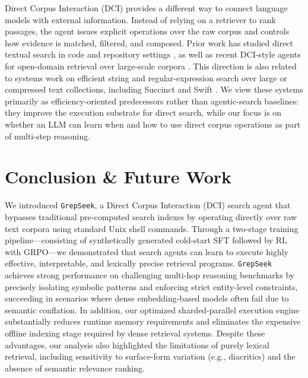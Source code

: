 \documentclass{article} %
\newcommand{\ourmethod}{\texttt{GrepSeek}\xspace}
\begin{document}
Direct Corpus Interaction (DCI) provides a different way to connect language models with external information. Instead of relying on a retriever to rank passages, the agent issues explicit operations over the raw corpus and controls how evidence is matched, filtered, and composed. Prior work has studied direct textual search in code and repository settings \citep{10.1145/3565971,wang2026grepragempiricalstudyoptimization}, as well as recent DCI-style agents for open-domain retrieval over large-scale corpora \citep{sen2026grepneedagentharnesses,dci-agent, subramanian2025keywordsearchneedachieving}. This direction is also related to systems work on efficient string and regular-expression search over large or compressed text collections, including Succinct and Swift \citep{188994,NAVARRO2003423}. We view these systems primarily as efficiency-oriented predecessors rather than agentic-search baselines: they improve the execution substrate for direct search, while our focus is on whether an LLM can learn when and how to use direct corpus operations as part of multi-step reasoning.






\section{Conclusion \& Future Work}

We introduced \ourmethod{}, a Direct Corpus Interaction (DCI) search agent that bypasses traditional pre-computed search indexes by operating directly over raw text corpora using standard Unix shell commands. Through a two-stage training pipeline---consisting of synthetically generated cold-start SFT followed by RL with GRPO---we demonstrated that search agents can learn to execute highly effective, interpretable, and lexically precise retrieval programs. \ourmethod{} achieves strong performance on challenging multi-hop reasoning benchmarks by precisely isolating symbolic patterns and enforcing strict entity-level constraints, succeeding in scenarios where dense embedding-based models often fail due to semantic conflation. In addition, our optimized sharded-parallel execution engine substantially reduces runtime memory requirements and eliminates the expensive offline indexing stage required by dense retrieval systems. Despite these advantages, our analysis also highlighted the limitations of purely lexical retrieval, including sensitivity to surface-form variation (e.g., diacritics) and the absence of semantic relevance ranking. 
\end{document}
